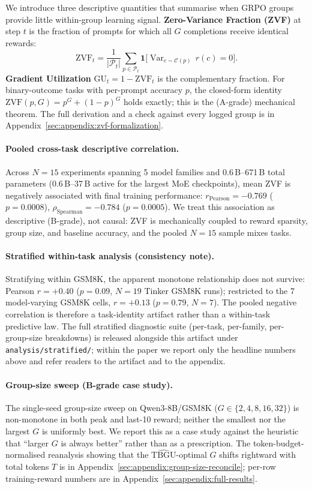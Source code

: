 \documentclass{article}
\begin{document}
We introduce three descriptive quantities that summarise when GRPO groups
provide little within-group learning signal. \textbf{Zero-Variance
Fraction (ZVF)} at step $t$ is the fraction of prompts for which all $G$
completions receive identical rewards:
\[
  \mathrm{ZVF}_t = \frac{1}{|\mathcal{P}_t|}\sum_{p \in \mathcal{P}_t}
  \mathbf{1}\bigl[\operatorname{Var}_{c \sim \mathcal{C}(p)}\,r(c) = 0\bigr].
\]
\textbf{Gradient Utilization} $\mathrm{GU}_t = 1 - \mathrm{ZVF}_t$ is the
complementary fraction. For binary-outcome tasks with per-prompt accuracy
$p$, the closed-form identity $\mathrm{ZVF}(p, G) = p^G + (1-p)^G$ holds
exactly; this is the (A-grade) mechanical theorem. The full derivation
and a check against every logged group is in
Appendix~\ref{sec:appendix:zvf-formalization}.

\paragraph{Pooled cross-task descriptive correlation.}
Across $N = 15$ experiments spanning 5 model families and
0.6\,B--671\,B total parameters (0.6\,B--37\,B active for the largest
MoE checkpoints), mean ZVF is negatively associated with final training
performance: $r_{\text{Pearson}} = -0.769$ ($p = 0.0008$),
$\rho_{\text{Spearman}} = -0.784$ ($p = 0.0005$).
We treat this association as descriptive (B-grade), not causal: ZVF is
mechanically coupled to reward sparsity, group size, and baseline
accuracy, and the pooled $N{=}15$ sample mixes tasks.

\paragraph{Stratified within-task analysis (consistency note).}
Stratifying within GSM8K, the apparent monotone relationship does not
survive: Pearson $r = +0.40$ ($p = 0.09$, $N{=}19$ Tinker GSM8K runs);
restricted to the 7 model-varying GSM8K cells, $r = +0.13$ ($p = 0.79$,
$N{=}7$). The pooled negative correlation is therefore a task-identity
artifact rather than a within-task predictive law. The full stratified
diagnostic suite (per-task, per-family, per-group-size breakdowns) is
released alongside this artifact under \texttt{analysis/stratified/};
within the paper we report only the headline numbers above and refer
readers to the artifact and to the appendix.

\paragraph{Group-size sweep (B-grade case study).}
The single-seed group-size sweep on Qwen3-8B/GSM8K
($G \in \{2,4,8,16,32\}$) is non-monotone in both peak and last-10
reward; neither the smallest nor the largest $G$ is uniformly best. We
report this as a case study against the heuristic that ``larger $G$ is
always better'' rather than as a prescription. The
token-budget-normalised reanalysis showing that the
$\widehat{\mathrm{TBGU}}$-optimal $G$ shifts rightward with total tokens
$T$ is in Appendix~\ref{sec:appendix:group-size-reconcile}; per-row
training-reward numbers are in Appendix~\ref{sec:appendix:full-results}.
\end{document}
